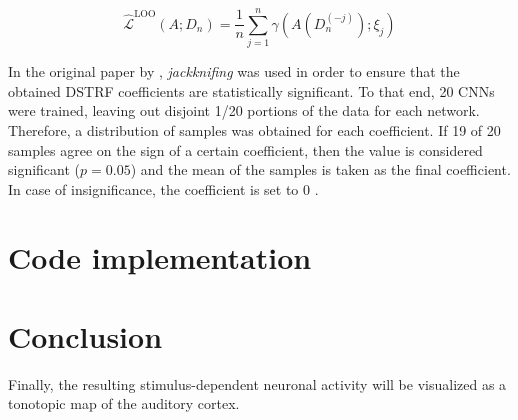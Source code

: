 \begin{equation}
	\hat{\mathcal{L}}^{\mathrm{LOO}}(A; D_n) = \frac{1}{n} \sum_{j=1}^n \gamma \left( A \left( D^{(-j)}_n \right); \xi_j \right)
\end{equation}
\noindent {} 

In the original paper by \textcite{keshishianEstimatingInterpretingNonlinear2020}, \emph{jackknifing} was used in order to ensure that the obtained DSTRF coefficients are statistically significant. To that end, 20 CNNs were trained, leaving out disjoint 1/20 portions of the data for each network. Therefore, a distribution of samples was obtained for each coefficient. If 19 of 20 samples agree on the sign of a certain coefficient, then the value is considered significant ($p=0.05$) and the mean of the samples is taken as the final coefficient. In case of insignificance, the coefficient is set to 0 \parencite{keshishianEstimatingInterpretingNonlinear2020}.

\section{Code implementation}

\section{Conclusion}
Finally, the resulting stimulus-dependent neuronal activity will be visualized as a tonotopic map of the auditory cortex.